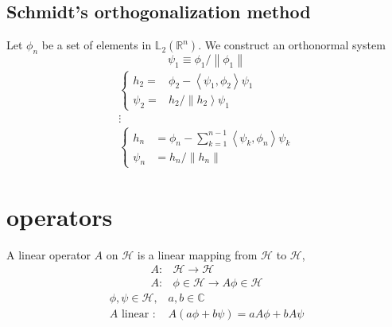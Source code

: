 \subsection{Schmidt's orthogonalization method}
Let {$\phi_n$} be a set of elements in $\mathbb{L}_2(\mathbb{R}^n)$. We construct an orthonormal system
\begin{equation}
    \psi_{1} \equiv \phi_{1} /\left\|\phi_{1}\right\|
    \end{equation}
\begin{equation}
\begin{array}{l}
{\left\{\begin{array}{ll}{h_{2}=} & {\phi_{2}-\left\langle\psi_{1}, \phi_{2}\right\rangle \psi_{1}} \\ 
{\psi_{2}=} & {\left.h_{2} / \| h_{2}\right\rangle \psi_{1}}\end{array}\right.} \\ 
\vdots\\
{\left\{
    \begin{array}{ll}
        {h_{n}} & {=\phi_{n}-\sum_{k=1}^{n-1}\left\langle\psi_{k}, \phi_{n}\right\rangle \psi_{k}} \\ 
        {\psi_{n}} & {=h_{n} /\left\|h_{n}\right\|}\end{array}\right.}
    \end{array}
\end{equation}
\section{operators}
A linear operator $A$ on $\mathcal{H}$ is a linear mapping from $\mathcal{H}$ to $\mathcal{H}$,
\begin{equation}
\begin{array}{ll}{A:} & {\mathcal{H} \rightarrow \mathcal{H}} \\ {A:} & {\phi \in \mathcal{H} \rightarrow A \phi \in \mathcal{H}}\end{array}
\end{equation}
\begin{equation}
\begin{array}{ll}{\phi, \psi \in \mathcal{H},} & {a, b \in \mathbb{C}} \\ {A \text { linear : }} & {A(a \phi+b \psi)=a A \phi+b A \psi}\end{array}
\end{equation}
